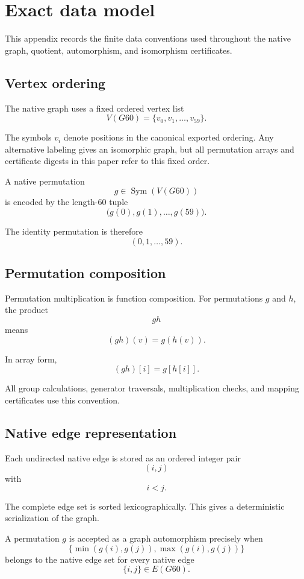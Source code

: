 \section{Exact data model}
\label{app:data-model}

This appendix records the finite data conventions used throughout the
native graph, quotient, automorphism, and isomorphism certificates.

\subsection{Vertex ordering}

The native graph uses a fixed ordered vertex list
\[
V(G60)=\{v_0,v_1,\ldots,v_{59}\}.
\]

The symbols $v_i$ denote positions in the canonical exported ordering.
Any alternative labeling gives an isomorphic graph, but all permutation
arrays and certificate digests in this paper refer to this fixed order.

A native permutation
\[
g\in\operatorname{Sym}(V(G60))
\]
is encoded by the length-$60$ tuple
\[
\bigl(g(0),g(1),\ldots,g(59)\bigr).
\]

The identity permutation is therefore
\[
(0,1,\ldots,59).
\]

\subsection{Permutation composition}

Permutation multiplication is function composition. For permutations
$g$ and $h$, the product
\[
gh
\]
means
\[
(gh)(v)=g(h(v)).
\]

In array form,
\[
(gh)[i]=g[h[i]].
\]

All group calculations, generator traversals, multiplication checks, and
mapping certificates use this convention.

\subsection{Native edge representation}

Each undirected native edge is stored as an ordered integer pair
\[
(i,j)
\]
with
\[
i<j.
\]

The complete edge set is sorted lexicographically. This gives a
deterministic serialization of the graph.

A permutation $g$ is accepted as a graph automorphism precisely when
\[
\{\min(g(i),g(j)),\max(g(i),g(j))\}
\]
belongs to the native edge set for every native edge
\[
\{i,j\}\in E(G60).
\]

